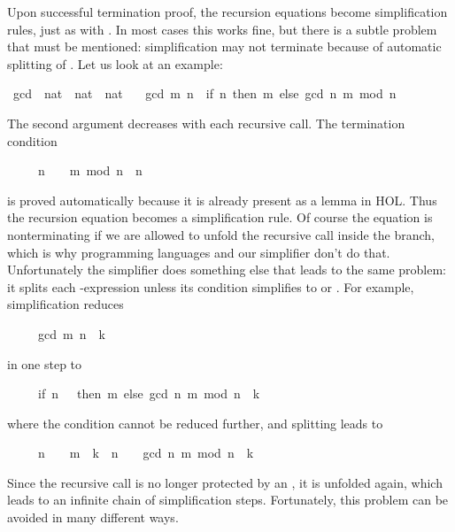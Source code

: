 \begin{isabellebody}
\begin{isamarkuptext}
Upon successful termination proof, the recursion equations become
simplification rules, just as with .
In most cases this works fine, but there is a subtle
problem that must be mentioned: simplification may not
terminate because of automatic splitting of .
Let us look at an example:%
\end{isamarkuptext}%
\isamarkuptrue%
\isamarkupfalse%
\ gcd\ {\isacharcolon}{\isacharcolon}\ {\isachardoublequoteopen}nat\ {\isasymRightarrow}\ nat\ {\isasymRightarrow}\ nat{\isachardoublequoteclose}\ \isanewline
\ \ {\isachardoublequoteopen}gcd\ m\ n\ {\isacharequal}\ {\isacharparenleft}if\ n{\isacharequal}{}\ then\ m\ else\ gcd\ n\ {\isacharparenleft}m\ mod\ n{\isacharparenright}{\isacharparenright}{\isachardoublequoteclose}%
\begin{isamarkuptext}%
\noindent
The second argument decreases with each recursive call.
The termination condition
\begin{isabelle}%
\ \ \ \ \ n\ {\isasymnoteq}\ {}\ {\isasymLongrightarrow}\ m\ mod\ n\ {\isacharless}\ n%
\end{isabelle}
is proved automatically because it is already present as a lemma in
HOL\@.  Thus the recursion equation becomes a simplification
rule. Of course the equation is nonterminating if we are allowed to unfold
the recursive call inside the  branch, which is why programming
languages and our simplifier don't do that. Unfortunately the simplifier does
something else that leads to the same problem: it splits 
each -expression unless its
condition simplifies to  or .  For
example, simplification reduces
\begin{isabelle}%
\ \ \ \ \ gcd\ m\ n\ {\isacharequal}\ k%
\end{isabelle}
in one step to
\begin{isabelle}%
\ \ \ \ \ {\isacharparenleft}if\ n\ {\isacharequal}\ {}\ then\ m\ else\ gcd\ n\ {\isacharparenleft}m\ mod\ n{\isacharparenright}{\isacharparenright}\ {\isacharequal}\ k%
\end{isabelle}
where the condition cannot be reduced further, and splitting leads to
\begin{isabelle}%
\ \ \ \ \ {\isacharparenleft}n\ {\isacharequal}\ {}\ {\isasymlongrightarrow}\ m\ {\isacharequal}\ k{\isacharparenright}\ {\isasymand}\ {\isacharparenleft}n\ {\isasymnoteq}\ {}\ {\isasymlongrightarrow}\ gcd\ n\ {\isacharparenleft}m\ mod\ n{\isacharparenright}\ {\isacharequal}\ k{\isacharparenright}%
\end{isabelle}
Since the recursive call  is no longer protected by
an , it is unfolded again, which leads to an infinite chain of
simplification steps. Fortunately, this problem can be avoided in many
different ways.


\end{isamarkuptext}
\end{isabellebody}
